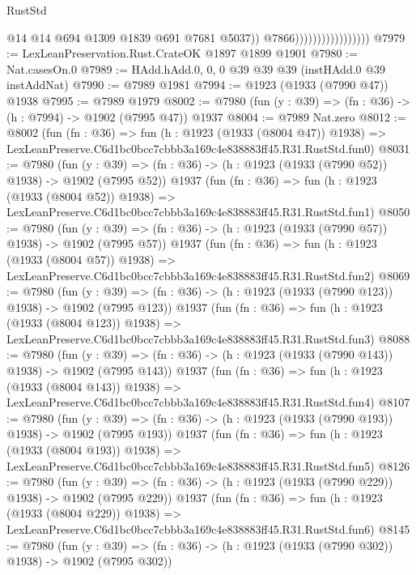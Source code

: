 \begin{lexlean}{RustStd}
\begin{coremodule}
                                          @14
                                          @14
                                          @694
                                          @1309
                                          @1839
                                          @691
                                          @7681
                                          @5037))
                                      @7866)))))))))))))))))
@7979 := LexLeanPreservation.Rust.CrateOK @1897 @1899 @1901
@7980 := Nat.casesOn.{0}
@7989 := HAdd.hAdd.{0, 0, 0} @39 @39 @39 (instHAdd.{0} @39 instAddNat)
@7990 := @7989 @1981
@7994 := @1923 (@1933 (@7990 @47)) @1938
@7995 := @7989 @1979
@8002 := @7980 (fun (y : @39) => (fn : @36) -> (h : @7994) -> @1902 (@7995 @47)) @1937
@8004 := @7989 Nat.zero
@8012 := @8002
    (fun (fn : @36) =>
    fun (h : @1923 (@1933 (@8004 @47)) @1938) =>
    LexLeanPreserve.C6d1bc0bcc7cbbb3a169c4e838883ff45.R31.RustStd.fun0)
@8031 := @7980
    (fun (y : @39) => (fn : @36) -> (h : @1923 (@1933 (@7990 @52)) @1938) -> @1902 (@7995 @52))
    @1937
    (fun (fn : @36) =>
    fun (h : @1923 (@1933 (@8004 @52)) @1938) =>
    LexLeanPreserve.C6d1bc0bcc7cbbb3a169c4e838883ff45.R31.RustStd.fun1)
@8050 := @7980
    (fun (y : @39) => (fn : @36) -> (h : @1923 (@1933 (@7990 @57)) @1938) -> @1902 (@7995 @57))
    @1937
    (fun (fn : @36) =>
    fun (h : @1923 (@1933 (@8004 @57)) @1938) =>
    LexLeanPreserve.C6d1bc0bcc7cbbb3a169c4e838883ff45.R31.RustStd.fun2)
@8069 := @7980
    (fun (y : @39) => (fn : @36) -> (h : @1923 (@1933 (@7990 @123)) @1938) -> @1902 (@7995 @123))
    @1937
    (fun (fn : @36) =>
    fun (h : @1923 (@1933 (@8004 @123)) @1938) =>
    LexLeanPreserve.C6d1bc0bcc7cbbb3a169c4e838883ff45.R31.RustStd.fun3)
@8088 := @7980
    (fun (y : @39) => (fn : @36) -> (h : @1923 (@1933 (@7990 @143)) @1938) -> @1902 (@7995 @143))
    @1937
    (fun (fn : @36) =>
    fun (h : @1923 (@1933 (@8004 @143)) @1938) =>
    LexLeanPreserve.C6d1bc0bcc7cbbb3a169c4e838883ff45.R31.RustStd.fun4)
@8107 := @7980
    (fun (y : @39) => (fn : @36) -> (h : @1923 (@1933 (@7990 @193)) @1938) -> @1902 (@7995 @193))
    @1937
    (fun (fn : @36) =>
    fun (h : @1923 (@1933 (@8004 @193)) @1938) =>
    LexLeanPreserve.C6d1bc0bcc7cbbb3a169c4e838883ff45.R31.RustStd.fun5)
@8126 := @7980
    (fun (y : @39) => (fn : @36) -> (h : @1923 (@1933 (@7990 @229)) @1938) -> @1902 (@7995 @229))
    @1937
    (fun (fn : @36) =>
    fun (h : @1923 (@1933 (@8004 @229)) @1938) =>
    LexLeanPreserve.C6d1bc0bcc7cbbb3a169c4e838883ff45.R31.RustStd.fun6)
@8145 := @7980
    (fun (y : @39) => (fn : @36) -> (h : @1923 (@1933 (@7990 @302)) @1938) -> @1902 (@7995 @302))

\end{coremodule}
\end{lexlean}

